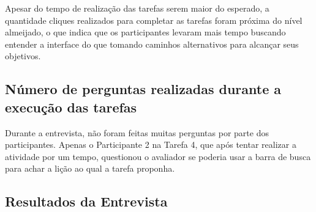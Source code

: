 Apesar do tempo de realização das tarefas serem maior do esperado, a quantidade cliques realizados para completar as tarefas foram próxima do nível almeijado, o que indica que os participantes levaram mais tempo buscando entender a interface do que tomando caminhos alternativos para alcançar seus objetivos.

\subsection{Número de perguntas realizadas durante a execução das tarefas}
Durante a entrevista, não foram feitas muitas perguntas por parte dos participantes. Apenas o Participante 2 na Tarefa 4, que após tentar realizar a atividade por um tempo, questionou o avaliador se poderia usar a barra de busca para achar a lição ao qual a tarefa proponha.

\subsection{Resultados da Entrevista}

